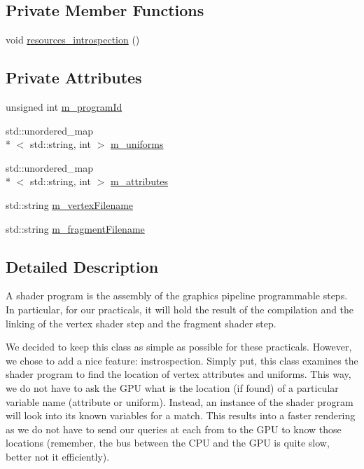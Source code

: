 \subsection*{Private Member Functions}
\begin{DoxyCompactItemize}
\item 
void \hyperlink{classShaderProgram_a45d8be40b24fffbc195f8bb57c5a5195}{resources\+\_\+introspection} ()
\end{DoxyCompactItemize}
\subsection*{Private Attributes}
\begin{DoxyCompactItemize}
\item 
unsigned int \hyperlink{classShaderProgram_a131f977e3396fd633f2c58e9919590a4}{m\+\_\+program\+Id}
\item 
std\+::unordered\+\_\+map\\*
$<$ std\+::string, int $>$ \hyperlink{classShaderProgram_a97e3260f6a74a23c0ce43e2b2f535d69}{m\+\_\+uniforms}
\item 
std\+::unordered\+\_\+map\\*
$<$ std\+::string, int $>$ \hyperlink{classShaderProgram_a0386f31b01d73becea688fb534298336}{m\+\_\+attributes}
\item 
std\+::string \hyperlink{classShaderProgram_a2f5d149deaba5b4cd9e925d3860ca078}{m\+\_\+vertex\+Filename}
\item 
std\+::string \hyperlink{classShaderProgram_aad0272796704f94875ef0d09db3d4c82}{m\+\_\+fragment\+Filename}
\end{DoxyCompactItemize}


\subsection{Detailed Description}
A shader program is the assembly of the graphics pipeline programmable steps. In particular, for our practicals, it will hold the result of the compilation and the linking of the vertex shader step and the fragment shader step.

We decided to keep this class as simple as possible for these practicals. However, we chose to add a nice feature\+: instrospection. Simply put, this class examines the shader program to find the location of vertex attributes and uniforms. This way, we do not have to ask the G\+P\+U what is the location (if found) of a particular variable name (attribute or uniform). Instead, an instance of the shader program will look into its known variables for a match. This results into a faster rendering as we do not have to send our queries at each from to the G\+P\+U to know those locations (remember, the bus between the C\+P\+U and the G\+P\+U is quite slow, better not it efficiently). 

